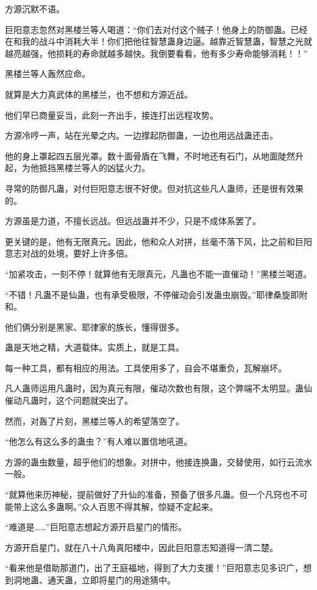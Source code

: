 \begin{this_body}
方源沉默不语。

巨阳意志忽然对黑楼兰等人喝道：“你们去对付这个贼子！他身上的防御蛊。已经在和我的战斗中消耗大半！你们把他往智慧蛊身边逼。越靠近智慧蛊，智慧之光就越亮越强，他损耗的寿命就越多越快。我倒要看看，他有多少寿命能够消耗！！”

黑楼兰等人轰然应命。

就算是大力真武体的黑楼兰，也不想和方源近战。

他们早已商量妥当，此刻一齐出手，接连打出远程攻势。

方源冷哼一声，站在光晕之内。一边撑起防御蛊，一边也用远战蛊还击。

他的身上罩起四五层光罩。数十面骨盾在飞舞，不时地还有石门，从地面陡然升起，为他抵挡黑楼兰等人的凶猛火力。

寻常的防御凡蛊，对付巨阳意志很不好使。但对抗这些凡人蛊师，还是很有效果的。

方源虽是力道，不擅长远战。但远战蛊并不少，只是不成体系罢了。

更关键的是，他有无限真元。因此，他和众人对拼，丝毫不落下风，比之前和巨阳意志对战的处境，要好上许多倍。

“加紧攻击，一刻不停！就算他有无限真元，凡蛊也不能一直催动！”黑楼兰喝道。

“不错！凡蛊不是仙蛊，也有承受极限，不停催动会引发蛊虫崩毁。”耶律桑旋即附和。

他们俩分别是黑家、耶律家的族长，懂得很多。

蛊是天地之精，大道载体。实质上，就是工具。

每一种工具，都有相应的用法。工具使用多了，自会不堪重负，瓦解崩坏。

凡人蛊师运用凡蛊时，因为真元有限，催动次数也有限，这个弊端不太明显。蛊仙催动凡蛊时，这个问题就突出了。

然而，对轰了片刻，黑楼兰等人的希望落空了。

“他怎么有这么多的蛊虫？”有人难以置信地吼道。

方源的蛊虫数量，超乎他们的想象。对拼中，他接连换蛊，交替使用，如行云流水一般。

“就算他来历神秘，提前做好了升仙的准备，预备了很多凡蛊。但一个凡窍也不可能带上这么多蛊啊。”众人百思不得其解，惊疑不定起来。

“难道是……”巨阳意志想起方源开启星门的情形。

方源开启星门，就在八十八角真阳楼中，因此巨阳意志知道得一清二楚。

“看来他是借助那道门，出了王庭福地，得到了大力支援！”巨阳意志见多识广，想到洞地蛊、通天蛊，立即将星门的用途猜中。


\end{this_body}
